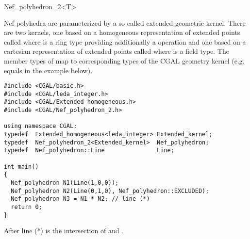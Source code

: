 \begin{ccRefClass}{Nef_polyhedron_2<T>}
\ccExample

Nef polyhedra are parameterized by a so called extended
geometric kernel. There are two kernels, one based on a homogeneous
representation of extended points called 
where  is a ring type providing additionally a  operation and
one based on a cartesian representation of extended points called
 where  is a field type. The member types
of  map to corresponding
types of the CGAL geometry kernel (e.g.  equals
 in the example below).
\begin{verbatim}
#include <CGAL/basic.h>
#include <CGAL/leda_integer.h>
#include <CGAL/Extended_homogeneous.h>
#include <CGAL/Nef_polyhedron_2.h>

using namespace CGAL;
typedef  Extended_homogeneous<leda_integer> Extended_kernel;
typedef  Nef_polyhedron_2<Extended_kernel>  Nef_polyhedron;
typedef  Nef_polyhedron::Line               Line;

int main()
{
  Nef_polyhedron N1(Line(1,0,0));
  Nef_polyhedron N2(Line(0,1,0), Nef_polyhedron::EXCLUDED);
  Nef_polyhedron N3 = N1 * N2; // line (*)
  return 0;
}
\end{verbatim}
After line (*)  is the intersection of  and . 



\end{ccRefClass}


